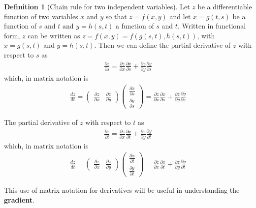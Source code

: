 \documentclass[
]{book}
\theoremstyle{definition}
\newtheorem{definition}{Definition}[chapter]
\theoremstyle{definition}
\theoremstyle{definition}
\theoremstyle{definition}
\theoremstyle{remark}
\begin{document}
\begin{definition}[Chain rule for two independent variables]
Let \(z\) be a differentiable function of two variables \(x\) and \(y\) so that \(z = f(x, y)\) and let \(x=g(t, s)\) be a function of \(s\) and \(t\) and \(y=h(s, t)\) a function of \(s\) and \(t\). Written in functional form, \(z\) can be written as \(z = f(x, y) = f(g(s, t), h(s, t))\), with \(x=g(s, t)\) and \(y=h(s, t)\). Then we can define the partial derivative of \(z\) with respect to \(s\) as
\[
\begin{aligned}
\frac{\partial z}{\partial s} = \frac{\partial z}{ \partial x}\frac{\partial x}{\partial s} + \frac{\partial z}{\partial y}\frac{\partial y}{\partial s}
\end{aligned}
\]
which, in matrix notation is
\[
\begin{aligned}
\frac{dz}{dt} = \begin{pmatrix} \frac{\partial z}{ \partial x} & \frac{\partial z}{\partial y} \end{pmatrix} \begin{pmatrix} \frac{\partial x}{\partial s} \\  \frac{\partial y}{\partial s} \end{pmatrix} = \frac{\partial z}{ \partial x}\frac{\partial x}{\partial s} + \frac{\partial z}{\partial y}\frac{\partial y}{\partial s}
\end{aligned}
\]

The partial derivative of \(z\) with respect to \(t\) as
\[
\begin{aligned}
\frac{\partial z}{\partial t} = \frac{\partial z}{ \partial x}\frac{\partial x}{\partial t} + \frac{\partial z}{\partial y}\frac{\partial y}{\partial t}
\end{aligned}
\]
which, in matrix notation is
\[
\begin{aligned}
\frac{dz}{dt} = \begin{pmatrix} \frac{\partial z}{ \partial x} & \frac{\partial z}{\partial y} \end{pmatrix} \begin{pmatrix} \frac{\partial x}{\partial t} \\  \frac{\partial y}{\partial t} \end{pmatrix} = \frac{\partial z}{ \partial x}\frac{\partial x}{\partial t} + \frac{\partial z}{\partial y}\frac{\partial y}{\partial t}
\end{aligned}
\]
\end{definition}

This use of matrix notation for derivatives will be useful in understanding the \textbf{gradient}.
\end{document}
